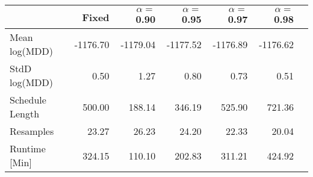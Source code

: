 \begin{tabular} {lrrrrrr} 
 \hline \hline 
&Fixed&$\alpha = $0.90&$\alpha = $0.95&$\alpha = $0.97&$\alpha = $0.98\\ 
 \hline 
Mean log(MDD)&-1176.70&-1179.04&-1177.52&-1176.89&-1176.62\\ 
StdD log(MDD)&0.50&1.27&0.80&0.73&0.51\\ 
Schedule Length&500.00&188.14&346.19&525.90&721.36\\ 
Resamples&23.27&26.23&24.20&22.33&20.04\\ 
Runtime [Min]&324.15&110.10&202.83&311.21&424.92\\ 
\hline 
\end{tabular}